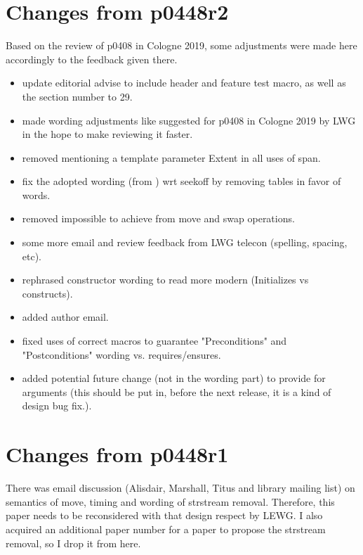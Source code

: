 \documentclass[ebook,11pt,article]{memoir}
\begin{document}
\section{Changes from p0448r2}
Based on the review of p0408 in Cologne 2019, some adjustments were made here accordingly to the feedback given there.
\begin{itemize}
\item update editorial advise to include header and feature test macro, as well as the section number to 29.
\item made wording adjustments like suggested for p0408 in Cologne 2019 by LWG in the hope to make reviewing it faster.
\item removed mentioning a template parameter Extent in all uses of span.
\item fix the adopted wording (from ) wrt seekoff by removing tables in favor of words.
\item removed impossible to achieve  from move and swap operations.
\item some more email and review feedback from LWG telecon (spelling, spacing, etc).
\item rephrased constructor wording to read more modern (Initializes vs constructs).
\item added author email.
\item fixed uses of correct macros to guarantee "Preconditions" and "Postconditions" wording vs. requires/ensures.
\item added potential future change (not in the wording part) to provide  for  arguments (this should be put in, before the next release, it is a kind of design bug fix.).
\end{itemize}


\section{Changes from p0448r1}
There was email discussion (Alisdair, Marshall, Titus and library mailing list) on semantics of move, timing and wording of strstream removal. Therefore, this paper needs to be reconsidered with that design respect by LEWG. I also acquired an additional paper number for a paper to propose the strstream removal, so I drop it from here.
\end{document}
